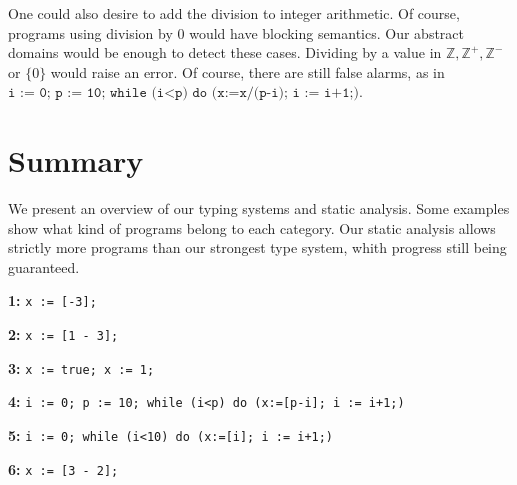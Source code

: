 One could also desire to add the division to integer arithmetic. Of course, programs using division by 0 would have blocking semantics. Our abstract domains would be enough to detect these cases. Dividing by a value in $\mathbb{Z}, \mathbb{Z^+}, \mathbb{Z^-}$ or $\lbrace 0 \rbrace$ would raise an error. Of course, there are still false alarms, as in $\texttt{i := 0; p := 10; while (i<p) do (x:=x/(p-i); i := i+1;)}$.



\section*{Summary}

We present an overview of our typing systems and static analysis. Some examples show what kind of programs belong to each category. Our static analysis allows strictly more programs than our strongest type system, whith progress still being guaranteed.

  \begin{center}
  \end{center}

  
  \textbf{1:}
  \texttt{x := [-3];}

  \textbf{2:}
  \texttt{x := [1 - 3];}

  \textbf{3:}
  \texttt{x := true; x := 1;}

  \textbf{4:}
  \texttt{i := 0; p := 10; while (i<p) do (x:=[p-i]; i := i+1;)}

  \textbf{5:}
  \texttt{i := 0; while (i<10) do (x:=[i]; i := i+1;)}

  \textbf{6:}
  \texttt{x := [3 - 2];}
    
